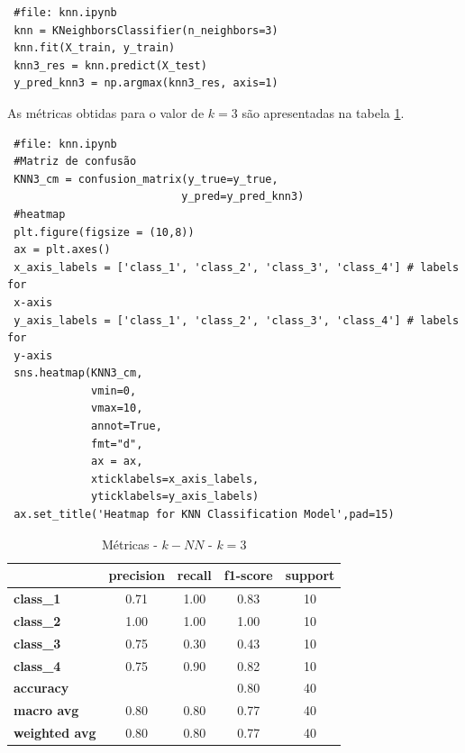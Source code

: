 \documentclass[
	article,			%
	11pt,				%
	oneside,			%
	a4paper,			%
	english,			%
	brazil,				%
	sumario=tradicional
	]{abntex2}
\begin{document}
\begin{verbatim}
 #file: knn.ipynb
 knn = KNeighborsClassifier(n_neighbors=3)
 knn.fit(X_train, y_train)
 knn3_res = knn.predict(X_test)
 y_pred_knn3 = np.argmax(knn3_res, axis=1)
\end{verbatim}

As métricas obtidas para o valor de $k=3$ são apresentadas na tabela \ref{tab:knn_01}.

\begin{verbatim}
 #file: knn.ipynb
 #Matriz de confusão
 KNN3_cm = confusion_matrix(y_true=y_true, 
                           y_pred=y_pred_knn3)
 #heatmap                           
 plt.figure(figsize = (10,8))
 ax = plt.axes()
 x_axis_labels = ['class_1', 'class_2', 'class_3', 'class_4'] # labels for
 x-axis
 y_axis_labels = ['class_1', 'class_2', 'class_3', 'class_4'] # labels for 
 y-axis
 sns.heatmap(KNN3_cm,
             vmin=0,
             vmax=10,
             annot=True,
             fmt="d",
             ax = ax,
             xticklabels=x_axis_labels, 
             yticklabels=y_axis_labels)
 ax.set_title('Heatmap for KNN Classification Model',pad=15)
\end{verbatim}

\begin{table}[h!]
\centering
\begin{tabular}{l|c|c|c|c|}
\cline{2-5}
                                            & \textbf{precision} & \textbf{recall} & \textbf{f1-score} & \textbf{support} \\ \hline
\multicolumn{1}{|l|}{\textbf{class\_1}}     & 0.71               & 1.00            & 0.83              & 10               \\ \hline
\multicolumn{1}{|l|}{\textbf{class\_2}}     & 1.00               & 1.00            & 1.00              & 10               \\ \hline
\multicolumn{1}{|l|}{\textbf{class\_3}}     & 0.75               & 0.30            & 0.43              & 10               \\ \hline
\multicolumn{1}{|l|}{\textbf{class\_4}}     & 0.75               & 0.90            & 0.82              & 10               \\ \hline
\multicolumn{1}{|l|}{\textbf{accuracy}}     &                    &                 & 0.80              & 40               \\ \hline
\multicolumn{1}{|l|}{\textbf{macro avg}}    & 0.80               & 0.80            & 0.77              & 40               \\ \hline
\multicolumn{1}{|l|}{\textbf{weighted avg}} & 0.80               & 0.80            & 0.77              & 40               \\ \hline
\end{tabular}
\caption{Métricas - $k-NN$ - $k=3$}
\label{tab:knn_01}
\end{table}
\end{document}
